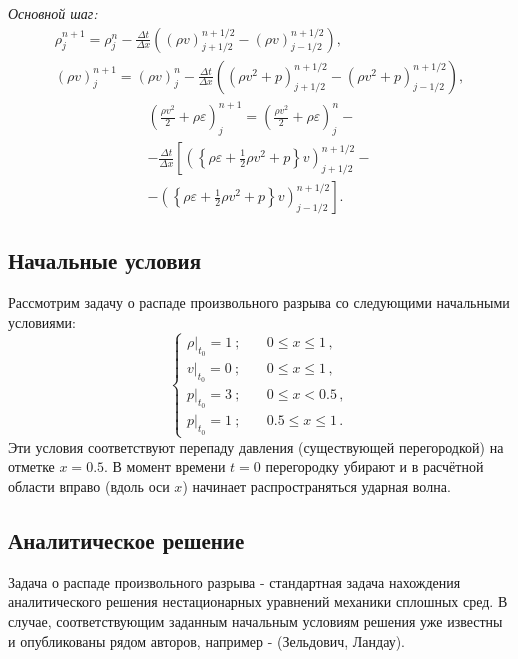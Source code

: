 \documentclass[a4paper]{article}
\begin{document}
	\textit{Основной шаг:}
	\begin{gather}\label{HydroMain}
	\rho_{j}^{n+1} = \rho_{j}^{n} - \frac{\Delta t}{\Delta x} \left(
		(\rho v)_{j+1/2}^{n+1/2} - (\rho v)_{j-1/2}^{n+1/2}				 \right) , \\
	(\rho v)_{j}^{n+1} = (\rho v)_{j}^{n} - \frac{\Delta t}{\Delta x} \left(
		(\rho v^2 + p)_{j+1/2}^{n+1/2} - (\rho v^2 + p)_{j-1/2}^{n+1/2}				 \right) ,
	\end{gather}
	\begin{multline}
		\left(\frac{\rho v^2}{2} + \rho \varepsilon	\right)_{j}^{n+1} = 
		\left(\frac{\rho v^2}{2} + \rho \varepsilon	\right)_{j}^{n} -
		\\ - \frac{\Delta t}{\Delta x} \left[
		\left(\left\{\rho \varepsilon + \frac{1}{2}\rho v^2 + p\right\}v\right)_{j+1/2}^{n+1/2} - \right. 
		\\\left. - \left(\left\{\rho \varepsilon + \frac{1}{2}\rho v^2 + p\right\}v\right)_{j-1/2}^{n+1/2} \right] .
	\end{multline}
	
	\subsection{Начальные условия}
	Рассмотрим задачу о распаде произвольного разрыва со следующими начальными условиями:
	\begin{equation}
	\begin{cases}
		\left.\rho \right|_{t_0} = 1 \:;		&\quad		0 \leqslant x \leqslant 1 \, ,	\\
		\left. v   \right|_{t_0} = 0 \:;		&\quad		0 \leqslant x \leqslant 1 \, ,	\\
		\left. p   \right|_{t_0} = 3 \:;		&\quad		0 \leqslant x < 0.5 \, ,	\\
		\left. p   \right|_{t_0} = 1 \:;		&\quad		0.5 \leqslant x \leqslant 1 \, .	
	\end{cases}
	\end{equation}	
	Эти условия соответствуют перепаду давления (существующей перегородкой) на отметке $x = 0.5$. В момент времени $t = 0$ перегородку убирают и в расчётной области вправо (вдоль оси $x$) начинает распространяться ударная волна.
	
	\subsection{Аналитическое решение}
	Задача о распаде произвольного разрыва - стандартная задача нахождения аналитического решения нестационарных уравнений механики сплошных сред. В случае, соответствующим заданным начальным условиям решения уже известны и опубликованы рядом авторов, например - (Зельдович, Ландау).
	
\end{document}
